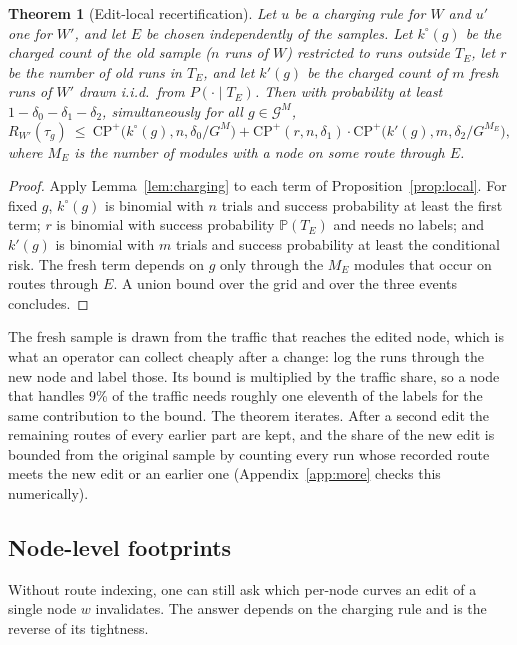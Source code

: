 \documentclass[11pt]{article}
\newtheorem{theorem}{Theorem}
\theoremstyle{definition}
\theoremstyle{remark}
\newcommand{\Prob}{\mathbb{P}}
\newcommand{\CP}{\mathrm{CP}^{+}}
\begin{document}
\begin{theorem}[Edit-local recertification]\label{thm:recert}
Let $u$ be a charging rule for $W$ and $u'$ one for $W'$, and let $E$ be chosen independently
of the samples. Let $k^{\circ}(g)$ be the charged count of the old sample ($n$ runs of $W$)
restricted to runs outside $T_E$, let $r$ be the number of old runs in $T_E$, and let $k'(g)$
be the charged count of $m$ fresh runs of $W'$ drawn i.i.d.\ from $P(\cdot\mid T_E)$. Then with
probability at least $1-\delta_0-\delta_1-\delta_2$, simultaneously for all $g\in\mathcal G^M$,
\[
R_{W'}(\tau_g)\ \le\ \CP\bigl(k^{\circ}(g),n,\delta_0/G^{M}\bigr)
+\CP(r,n,\delta_1)\cdot\CP\bigl(k'(g),m,\delta_2/G^{M_E}\bigr),
\]
where $M_E$ is the number of modules with a node on some route through $E$.
\end{theorem}
\begin{proof}
Apply Lemma~\ref{lem:charging} to each term of Proposition~\ref{prop:local}. For fixed $g$,
$k^\circ(g)$ is binomial with $n$ trials and success probability at least the first term;
$r$ is binomial with success probability $\Prob(T_E)$ and needs no labels; and $k'(g)$ is
binomial with $m$ trials and success probability at least the conditional risk. The fresh
term depends on $g$ only through the $M_E$ modules that occur on routes through $E$. A union
bound over the grid and over the three events concludes.
\end{proof}

The fresh sample is drawn from the traffic that reaches the edited node, which is what an
operator can collect cheaply after a change: log the runs through the new node and label
those. Its bound is multiplied by the traffic share, so a node that handles 9\% of the traffic
needs roughly one eleventh of the labels for the same contribution to the bound. The theorem
iterates. After a second edit the remaining routes of every earlier part are kept, and the
share of the new edit is bounded from the original sample by counting every run whose
recorded route meets the new edit or an earlier one (Appendix~\ref{app:more} checks this
numerically).

\subsection{Node-level footprints}\label{sec:footprint}

Without route indexing, one can still ask which per-node curves an edit of a single node $w$
invalidates. The answer depends on the charging rule and is the reverse of its tightness.
\end{document}
